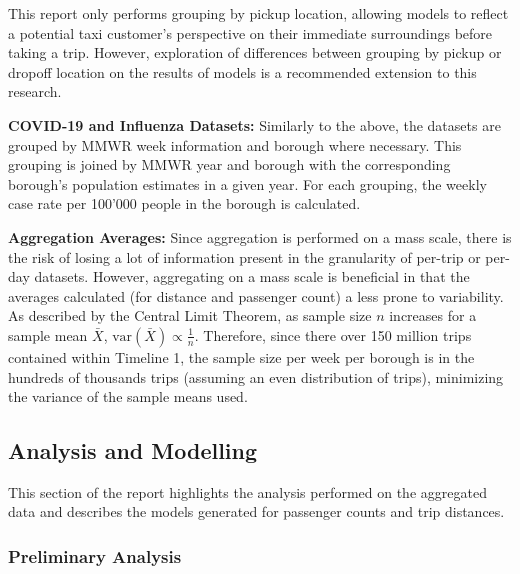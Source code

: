 \documentclass[11pt]{article}
\begin{document}
This report only performs grouping by pickup location,
allowing models to reflect a potential taxi customer's perspective on their immediate surroundings before taking a trip.
However, exploration of differences between grouping by pickup or dropoff location on the results of models 
is a recommended extension to this research.

\textbf{COVID-19 and Influenza Datasets:}
Similarly to the above, the datasets are grouped by MMWR week information and borough where necessary.
This grouping is joined by MMWR year and borough with the corresponding borough's population estimates in a given year.
For each grouping, the weekly case rate per 100'000 people in the borough is calculated.

\textbf{Aggregation Averages:}
Since aggregation is performed on a mass scale, there is the risk of losing a lot of information present in the granularity of per-trip or per-day datasets.
However, aggregating on a mass scale is beneficial in that the averages calculated (for distance and passenger count)
a less prone to variability. As described by the Central Limit Theorem, as sample size $n$ increases for a sample mean $\bar{X}$, 
$\text{var}(\bar{X}) \propto \frac{1}{n}$. Therefore, since there over 150 million trips contained within Timeline 1, the sample size per week per borough is in the hundreds of thousands trips (assuming an even distribution of trips),
minimizing the variance of the sample means used.

\pagebreak
\subsection{Analysis and Modelling}

This section of the report highlights the analysis performed on the aggregated data
and describes the models generated for passenger counts and trip distances.

\subsubsection{Preliminary Analysis}
\end{document}
